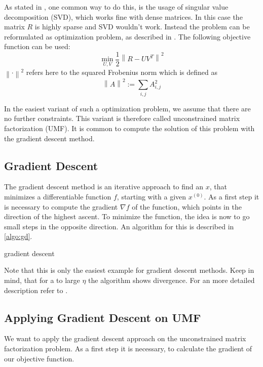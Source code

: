 \documentclass[DIV=14,twocolumn]{scrartcl}
\newcommand{\norm}[1]{\left\lVert#1\right\rVert}
\begin{document}
As stated in \cite{KoBeVo09}, one common way to do this, is the usage of singular value decomposition (SVD), which works fine with dense matrices. In this case the matrix $R$ is highly sparse and SVD wouldn't work. Instead the problem can be reformulated as optimization problem, as described in \cite{Ag16}. The following objective function can be used: 
$$\min_{U,V} \frac{1}{2}\norm{R-UV^T}^2$$ 
$\norm{\cdot}^2$ refers here to the squared Frobenius norm which is defined as $$\norm{A}^2:=\sum_{i,j}A_{i,j}^2$$

In the easiest variant of such a optimization problem, we assume that there are no further constraints. This variant is therefore called unconstrained matrix factorization (UMF). 
It is common to compute the solution of this problem with the gradient descent method.

\subsection{Gradient Descent}\label{gd}
The gradient descent method is an iterative approach to find an $x$, that minimizes a differentiable function $f$, starting with a given $x^{(0)}$. As a first step it is necessary to compute the gradient $\nabla f$ of the function, which points in the direction of the highest ascent. 
To minimize the function, the idea is now to go small steps in the opposite direction. An algorithm for this is described in \autoref{algo:gd}. 

\begin{algorithm}
	\caption{gradient descent}
	\label{algo:gd}

\end{algorithm}
Note that this is only the easiest example for gradient descent methods. Keep in mind, that for a to large $\eta$ the algorithm shows divergence.
For an more detailed description refer to \cite{ShSh14}. 

\subsection{Applying Gradient Descent on UMF} 
We want to apply the gradient descent approach on the unconstrained matrix factorization problem. 
As a first step it is necessary, to calculate the gradient of our objective function. 
\end{document}
